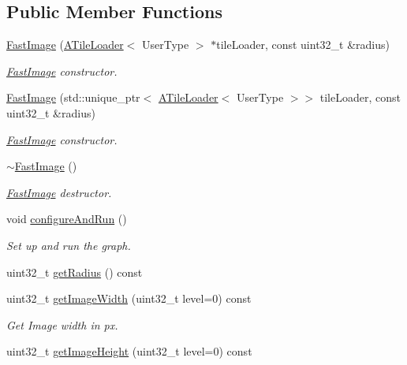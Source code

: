 \subsection*{Public Member Functions}
\begin{DoxyCompactItemize}
\item 
\hyperlink{classfi_1_1FastImage_a1ac7484406bb49b685b27cab0ea2cbcf}{Fast\+Image} (\hyperlink{classfi_1_1ATileLoader}{A\+Tile\+Loader}$<$ User\+Type $>$ $\ast$tile\+Loader, const uint32\+\_\+t \&radius)
\begin{DoxyCompactList}\small\item\em \hyperlink{classfi_1_1FastImage}{Fast\+Image} constructor. \end{DoxyCompactList}\item 
\hyperlink{classfi_1_1FastImage_a0db8d5c797b4e6d13b09655d272ae22c}{Fast\+Image} (std\+::unique\+\_\+ptr$<$ \hyperlink{classfi_1_1ATileLoader}{A\+Tile\+Loader}$<$ User\+Type $>$$>$ tile\+Loader, const uint32\+\_\+t \&radius)
\begin{DoxyCompactList}\small\item\em \hyperlink{classfi_1_1FastImage}{Fast\+Image} constructor. \end{DoxyCompactList}\item 
\hyperlink{classfi_1_1FastImage_a694492eb7802678db82993d8d087604b}{$\sim$\+Fast\+Image} ()
\begin{DoxyCompactList}\small\item\em \hyperlink{classfi_1_1FastImage}{Fast\+Image} destructor. \end{DoxyCompactList}\item 
void \hyperlink{classfi_1_1FastImage_aa2ae5e5498f57462abd876108a55475c}{configure\+And\+Run} ()
\begin{DoxyCompactList}\small\item\em Set up and run the graph. \end{DoxyCompactList}\item 
uint32\+\_\+t \hyperlink{classfi_1_1FastImage_a17a18b7839a4fd6f8b1cfd2253983bd5}{get\+Radius} () const
\item 
uint32\+\_\+t \hyperlink{classfi_1_1FastImage_a1ea580c3c08fe5be5575f0007b1bafbe}{get\+Image\+Width} (uint32\+\_\+t level=0) const
\begin{DoxyCompactList}\small\item\em Get Image width in px. \end{DoxyCompactList}\item 
uint32\+\_\+t \hyperlink{classfi_1_1FastImage_a355d2e82840f50ccafe0ee681f9aa70f}{get\+Image\+Height} (uint32\+\_\+t level=0) const
$$
\end{DoxyCompactItemize}
